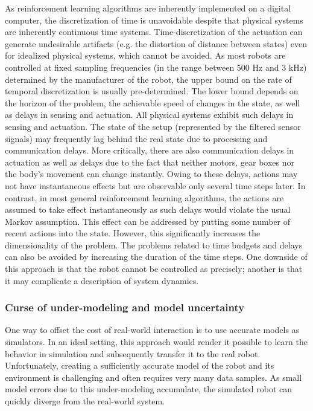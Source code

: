 As reinforcement learning algorithms are inherently implemented on a digital computer, the discretization of
time is unavoidable despite that physical systems are inherently continuous time systems. Time-discretization of the
actuation can generate undesirable artifacts (e.g. the distortion of distance between states) even for idealized physical
systems, which cannot be avoided. As most robots are controlled at fixed sampling frequencies (in the range between
500 Hz and 3 kHz) determined by the manufacturer of the robot, the upper bound on the rate of temporal discretization
is usually pre-determined. The lower bound depends on the horizon of the problem, the achievable speed of changes in
the state, as well as delays in sensing and actuation. All physical systems exhibit such delays in sensing and
actuation. The state of the setup (represented by the filtered sensor signals) may frequently lag behind the real state due
to processing and communication delays. More critically, there are also communication delays in actuation as well
as delays due to the fact that neither motors, gear boxes nor the body's movement can change instantly. Owing to
these delays, actions may not have instantaneous effects but are observable only several time steps later. In contrast, 
in most general reinforcement learning algorithms, the actions are assumed to take effect instantaneously as such
delays would violate the usual Markov assumption. This effect can be addressed by putting some number of recent
actions into the state. However, this significantly increases the dimensionality of the problem.
The problems related to time budgets and delays can also be avoided by increasing the duration of the time steps.
One downside of this approach is that the robot cannot be controlled as precisely; another is that it may complicate a
description of system dynamics.

\subsubsection{Curse of under-modeling and model uncertainty}
One way to offset the cost of real-world interaction is to use accurate models as simulators. In an ideal setting, this
approach would render it possible to learn the behavior in simulation and subsequently transfer it to the real robot.
Unfortunately, creating a sufficiently accurate model of the robot and its environment is challenging and often requires
very many data samples. As small model errors due to this under-modeling accumulate, the simulated robot can
quickly diverge from the real-world system.

